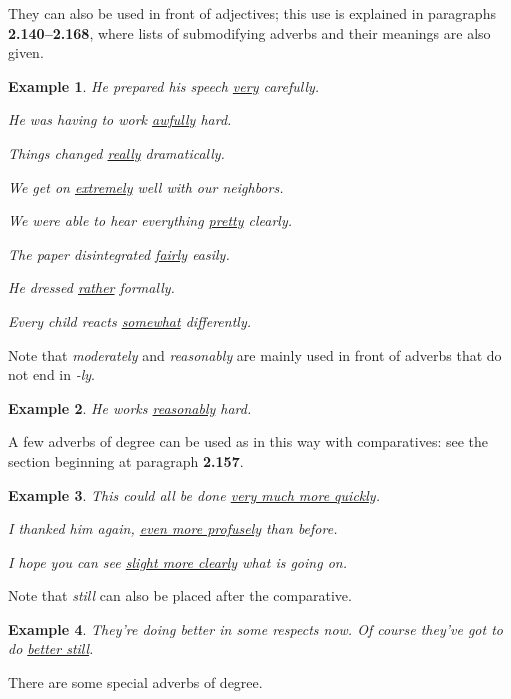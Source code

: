 \documentclass[oneside]{book}
\numberwithin{equation}{section}
\newtheorem{example}{Example}[section]
\begin{document}
%
They can also be used in front of adjectives; this use is explained in paragraphs \textbf{2.140--2.168}, where lists of submodifying adverbs and their meanings are also given.
\begin{example}
    He prepared his speech \underline{very} carefully.
    
    He was having to work \underline{awfully} hard.
    
    Things changed \underline{really} dramatically.
    
    We get on \underline{extremely} well with our neighbors.
    
    We were able to hear everything \underline{pretty} clearly.
    
    The paper disintegrated \underline{fairly} easily.
    
    He dressed \underline{rather} formally.
    
    Every child reacts \underline{somewhat} differently.
\end{example}
Note that \textit{moderately} and \textit{reasonably} are mainly used in front of adverbs that do not end in \textit{-ly}.
\begin{example}
    He works \underline{reasonably} hard.
\end{example}
A few adverbs of degree can be used as in this way with comparatives: see the section beginning at paragraph \textbf{2.157}.
\begin{example}
    This could all be done \underline{very much more quickly}.
    
    I thanked him again, \underline{even more profusely} than before.
    
    I hope you can see \underline{slight more clearly} what is going on.
\end{example}
Note that \textit{still} can also be placed after the comparative.
\begin{example}
    They're doing better in some respects now. Of course they've got to do \underline{better still}.
\end{example}
%
\noindent{} There are some special adverbs of degree.
\end{document}
